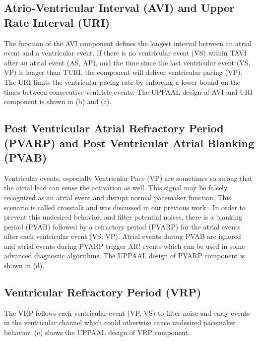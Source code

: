 \subsection{Atrio-Ventricular Interval (AVI) and Upper Rate Interval (URI)}
The function of the AVI component defines the longest interval between an atrial event and a ventricular event. If there is no ventricular event \textsf{(VS)}  within TAVI after an atrial event \textsf{(AS, AP)}, and the time since the last ventricular event \textsf{(VS, VP)} is longer than TURI, the component will deliver ventricular pacing \textsf{(VP)}. The URI limits the ventricular pacing rate by enforcing a lower bound on the times between consecutive ventricle events. The UPPAAL design of AVI and URI component is shown in (b) and (c).%

\subsection{Post Ventricular Atrial Refractory Period (PVARP) and Post Ventricular Atrial Blanking (PVAB)}
Ventricular events, especially Ventricular Pace (VP) are sometimes so strong that the atrial lead can sense the activation as well. This signal may be falsely recognized as an atrial event and disrupt normal pacemaker function. This scenario is called crosstalk and was discussed in our previous work \cite{vhm_embc11}. In order to prevent this undesired behavior, and filter potential noises, there is a blanking period (PVAB) followed by a refractory period (PVARP) for the atrial events after each ventricular event \textsf{(VS, VP)}. Atrial events during PVAB are ignored and atrial events during PVARP trigger \textsf{AR!} events which can be used in some advanced diagnostic algorithms. The UPPAAL design of PVARP component is shown in (d).

\subsection{Ventricular Refractory Period (VRP)}
The VRP follows each ventricular event \textsf{(VP, VS)} to filter noise and early events in the ventricular channel which could otherwise cause undesired pacemaker behavior. (e) shows the UPPAAL design of VRP component.

